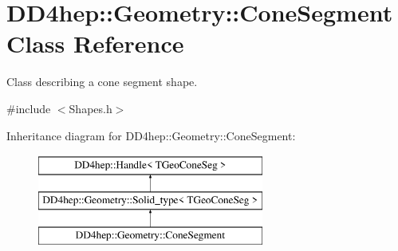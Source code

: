 \hypertarget{class_d_d4hep_1_1_geometry_1_1_cone_segment}{}\section{D\+D4hep\+:\+:Geometry\+:\+:Cone\+Segment Class Reference}
\label{class_d_d4hep_1_1_geometry_1_1_cone_segment}


Class describing a cone segment shape.  




{\ttfamily \#include $<$Shapes.\+h$>$}

Inheritance diagram for D\+D4hep\+:\+:Geometry\+:\+:Cone\+Segment\+:\begin{figure}[H]
\begin{center}
\leavevmode
\includegraphics[height=3.000000cm]{class_d_d4hep_1_1_geometry_1_1_cone_segment}
\end{center}
\end{figure}
